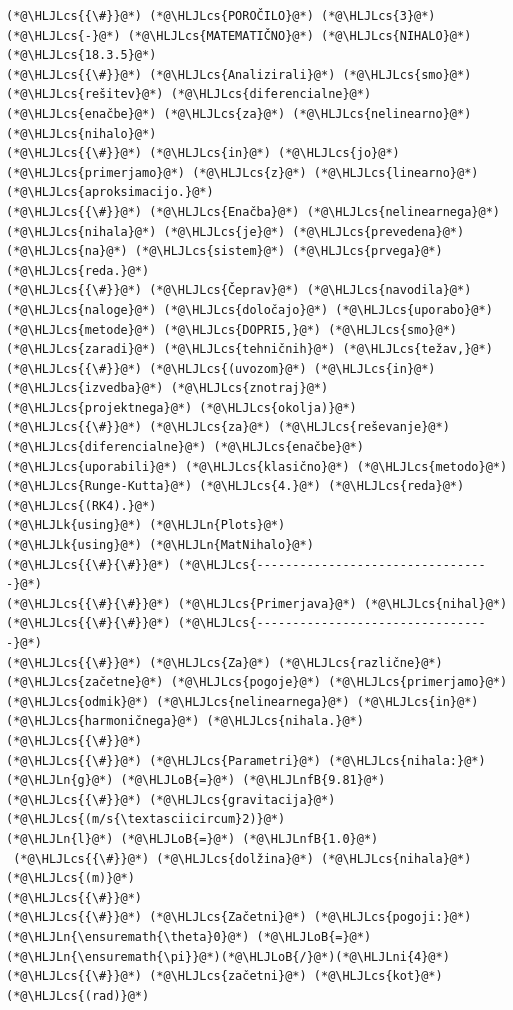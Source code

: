 \documentclass[12pt,a4paper]{article}
\newcommand{\HLJLk}[1]{\textcolor[RGB]{148,91,176}{\textbf{#1}}}
\newcommand{\HLJLn}[1]{#1}
\newcommand{\HLJLnfB}[1]{\textcolor[RGB]{59,151,46}{#1}}
\newcommand{\HLJLni}[1]{\textcolor[RGB]{59,151,46}{#1}}
\newcommand{\HLJLoB}[1]{\textcolor[RGB]{102,102,102}{\textbf{#1}}}
\newcommand{\HLJLcs}[1]{\textcolor[RGB]{153,153,119}{\textit{#1}}}
\begin{document}
\begin{lstlisting}
(*@\HLJLcs{{\#}}@*) (*@\HLJLcs{POROČILO}@*) (*@\HLJLcs{3}@*) (*@\HLJLcs{-}@*) (*@\HLJLcs{MATEMATIČNO}@*) (*@\HLJLcs{NIHALO}@*) (*@\HLJLcs{18.3.5}@*)
(*@\HLJLcs{{\#}}@*) (*@\HLJLcs{Analizirali}@*) (*@\HLJLcs{smo}@*) (*@\HLJLcs{rešitev}@*) (*@\HLJLcs{diferencialne}@*) (*@\HLJLcs{enačbe}@*) (*@\HLJLcs{za}@*) (*@\HLJLcs{nelinearno}@*) (*@\HLJLcs{nihalo}@*)
(*@\HLJLcs{{\#}}@*) (*@\HLJLcs{in}@*) (*@\HLJLcs{jo}@*) (*@\HLJLcs{primerjamo}@*) (*@\HLJLcs{z}@*) (*@\HLJLcs{linearno}@*) (*@\HLJLcs{aproksimacijo.}@*)
(*@\HLJLcs{{\#}}@*) (*@\HLJLcs{Enačba}@*) (*@\HLJLcs{nelinearnega}@*) (*@\HLJLcs{nihala}@*) (*@\HLJLcs{je}@*) (*@\HLJLcs{prevedena}@*) (*@\HLJLcs{na}@*) (*@\HLJLcs{sistem}@*) (*@\HLJLcs{prvega}@*) (*@\HLJLcs{reda.}@*)
(*@\HLJLcs{{\#}}@*) (*@\HLJLcs{Čeprav}@*) (*@\HLJLcs{navodila}@*) (*@\HLJLcs{naloge}@*) (*@\HLJLcs{določajo}@*) (*@\HLJLcs{uporabo}@*) (*@\HLJLcs{metode}@*) (*@\HLJLcs{DOPRI5,}@*) (*@\HLJLcs{smo}@*) (*@\HLJLcs{zaradi}@*) (*@\HLJLcs{tehničnih}@*) (*@\HLJLcs{težav,}@*)
(*@\HLJLcs{{\#}}@*) (*@\HLJLcs{(uvozom}@*) (*@\HLJLcs{in}@*) (*@\HLJLcs{izvedba}@*) (*@\HLJLcs{znotraj}@*) (*@\HLJLcs{projektnega}@*) (*@\HLJLcs{okolja)}@*)
(*@\HLJLcs{{\#}}@*) (*@\HLJLcs{za}@*) (*@\HLJLcs{reševanje}@*) (*@\HLJLcs{diferencialne}@*) (*@\HLJLcs{enačbe}@*) (*@\HLJLcs{uporabili}@*) (*@\HLJLcs{klasično}@*) (*@\HLJLcs{metodo}@*) (*@\HLJLcs{Runge-Kutta}@*) (*@\HLJLcs{4.}@*) (*@\HLJLcs{reda}@*) (*@\HLJLcs{(RK4).}@*)
(*@\HLJLk{using}@*) (*@\HLJLn{Plots}@*)
(*@\HLJLk{using}@*) (*@\HLJLn{MatNihalo}@*)
(*@\HLJLcs{{\#}{\#}}@*) (*@\HLJLcs{---------------------------------}@*)
(*@\HLJLcs{{\#}{\#}}@*) (*@\HLJLcs{Primerjava}@*) (*@\HLJLcs{nihal}@*)
(*@\HLJLcs{{\#}{\#}}@*) (*@\HLJLcs{---------------------------------}@*)
(*@\HLJLcs{{\#}}@*) (*@\HLJLcs{Za}@*) (*@\HLJLcs{različne}@*) (*@\HLJLcs{začetne}@*) (*@\HLJLcs{pogoje}@*) (*@\HLJLcs{primerjamo}@*) (*@\HLJLcs{odmik}@*) (*@\HLJLcs{nelinearnega}@*) (*@\HLJLcs{in}@*) (*@\HLJLcs{harmoničnega}@*) (*@\HLJLcs{nihala.}@*)
(*@\HLJLcs{{\#}}@*)
(*@\HLJLcs{{\#}}@*) (*@\HLJLcs{Parametri}@*) (*@\HLJLcs{nihala:}@*)
(*@\HLJLn{g}@*) (*@\HLJLoB{=}@*) (*@\HLJLnfB{9.81}@*)       (*@\HLJLcs{{\#}}@*) (*@\HLJLcs{gravitacija}@*) (*@\HLJLcs{(m/s{\textasciicircum}2)}@*)
(*@\HLJLn{l}@*) (*@\HLJLoB{=}@*) (*@\HLJLnfB{1.0}@*)        (*@\HLJLcs{{\#}}@*) (*@\HLJLcs{dolžina}@*) (*@\HLJLcs{nihala}@*) (*@\HLJLcs{(m)}@*)
(*@\HLJLcs{{\#}}@*)
(*@\HLJLcs{{\#}}@*) (*@\HLJLcs{Začetni}@*) (*@\HLJLcs{pogoji:}@*)
(*@\HLJLn{\ensuremath{\theta}0}@*) (*@\HLJLoB{=}@*) (*@\HLJLn{\ensuremath{\pi}}@*)(*@\HLJLoB{/}@*)(*@\HLJLni{4}@*)       (*@\HLJLcs{{\#}}@*) (*@\HLJLcs{začetni}@*) (*@\HLJLcs{kot}@*) (*@\HLJLcs{(rad)}@*)

\end{lstlisting}
\end{document}
